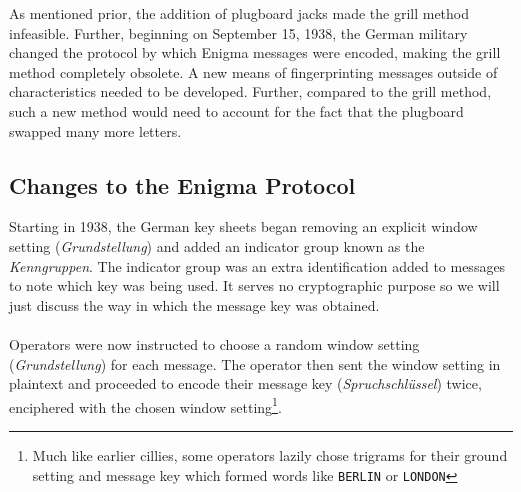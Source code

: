 As mentioned prior, the addition of plugboard jacks made the grill
method infeasible.
Further, beginning on September 15, 1938, the German military changed
the protocol by which Enigma messages were encoded, making the grill
method completely obsolete. A new means of fingerprinting messages
outside of characteristics needed to be developed. Further, compared
to the grill method, such a new method would need to account for the
fact that the plugboard swapped many more letters.

\subsection{Changes to the Enigma Protocol}

Starting in 1938, the German key sheets began removing an explicit
window setting (\emph{Grundstellung}) and added an indicator group
known as the \emph{Kenngruppen}. The indicator group was an extra
identification added to messages to note which key was being used. It
serves no cryptographic purpose so we will just discuss the way in
which the message key was obtained.
\\\\Operators were now instructed to choose a random window setting
(\emph{Grundstellung}) for each message. The operator then sent the
window setting in plaintext and proceeded to encode their message key
(\emph{Spruchschlüssel}) twice, enciphered with the chosen window
setting\footnote{Much like earlier cillies, some operators lazily chose trigrams for their ground setting and message key which formed words like \texttt{BERLIN} or \texttt{LONDON}}. %

